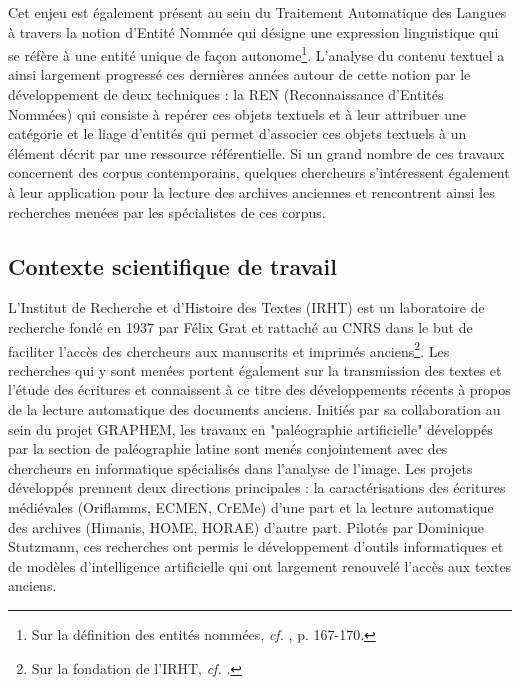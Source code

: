 \documentclass[a4paper,12pt,twoside]{book}
\begin{document}
	Cet enjeu est également présent au sein du Traitement Automatique des Langues à travers la notion d'Entité Nommée qui désigne une expression linguistique qui se réfère à une entité unique de façon autonome\footnote{Sur la définition des entités nommées, \textit{cf.} \cite{ehrmann_les_2008}, p. 167-170.}. L'analyse du contenu textuel a ainsi largement progressé ces dernières années autour de cette notion par le développement de deux techniques : la REN (Reconnaissance d'Entités Nommées) qui consiste à repérer ces objets textuels et à leur attribuer une catégorie et le liage d'entités qui permet d'associer ces objets textuels à un élément décrit par une ressource référentielle. Si un grand nombre de ces travaux concernent des corpus contemporains, quelques chercheurs s'intéressent également à leur application pour la lecture des archives anciennes et rencontrent ainsi les recherches menées par les spécialistes de ces corpus.
	
	\subsection*{Contexte scientifique de travail}
	
	L'Institut de Recherche et d'Histoire des Textes (IRHT) est un laboratoire de recherche fondé en 1937 par Félix Grat et rattaché au CNRS dans le but de faciliter l'accès des chercheurs aux manuscrits et imprimés anciens\footnote{Sur la fondation de l'IRHT, \textit{cf.} \cite{holtz_les_2000}.}. Les recherches qui y sont menées portent également sur la transmission des textes et l'étude des écritures et connaissent à ce titre des développements récents à propos de la lecture automatique des documents anciens. Initiés par sa collaboration au sein du projet GRAPHEM, les travaux en "paléographie artificielle" développés par la section de paléographie latine sont menés conjointement avec des chercheurs en informatique spécialisés dans l'analyse de l'image. Les projets développés prennent deux directions principales : la caractérisations des écritures médiévales (Oriflamms, ECMEN, CrEMe) d'une part et la lecture automatique des archives (Himanis, HOME, HORAE) d'autre part. Pilotés par Dominique Stutzmann, ces recherches ont permis le développement d'outils informatiques et de modèles d'intelligence artificielle qui ont largement renouvelé l'accès aux textes anciens.
	
\end{document}
